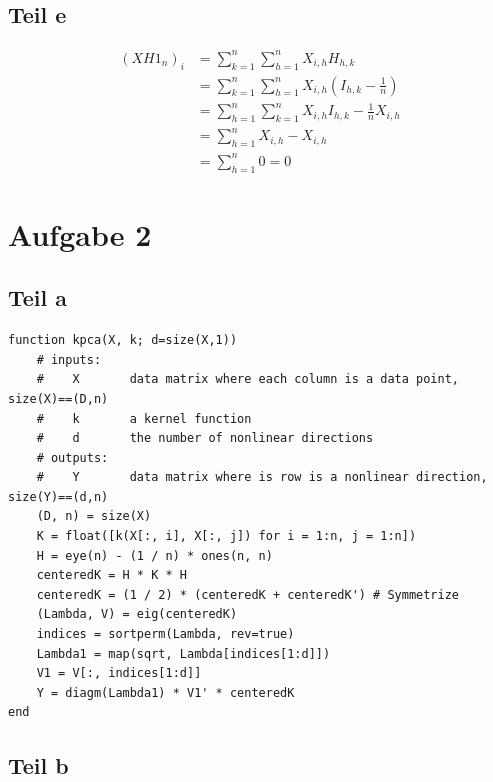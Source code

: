 \documentclass[10pt,a4paper]{article}
\begin{document}
\subsection{Teil e}

\begin{align*}
  (XH1_{n})_{i} & = \sum_{k = 1}^{n} \sum_{h = 1}^{n} X_{i,h} H_{h,k}\\
                & = \sum_{k = 1}^{n} \sum_{h = 1}^{n} X_{i,h} \left( I_{h,k} - \frac{1}{n} \right)\\
                & = \sum_{h = 1}^{n} \sum_{k = 1}^{n} X_{i,h} I_{h,k} - \frac{1}{n} X_{i,h}\\
                & = \sum_{h = 1}^{n} X_{i,h} - X_{i,h}\\
                & = \sum_{h = 1}^{n} 0 = 0
\end{align*}

\section{Aufgabe 2}

\subsection{Teil a}

\begin{verbatim}
function kpca(X, k; d=size(X,1))
    # inputs:
    #    X       data matrix where each column is a data point, size(X)==(D,n)
    #    k       a kernel function
    #    d       the number of nonlinear directions
    # outputs:
    #    Y       data matrix where is row is a nonlinear direction, size(Y)==(d,n)
    (D, n) = size(X)
    K = float([k(X[:, i], X[:, j]) for i = 1:n, j = 1:n])
    H = eye(n) - (1 / n) * ones(n, n)
    centeredK = H * K * H
    centeredK = (1 / 2) * (centeredK + centeredK') # Symmetrize
    (Lambda, V) = eig(centeredK)
    indices = sortperm(Lambda, rev=true)
    Lambda1 = map(sqrt, Lambda[indices[1:d]])
    V1 = V[:, indices[1:d]]
    Y = diagm(Lambda1) * V1' * centeredK
end
\end{verbatim}

\subsection{Teil b}
\end{document}
